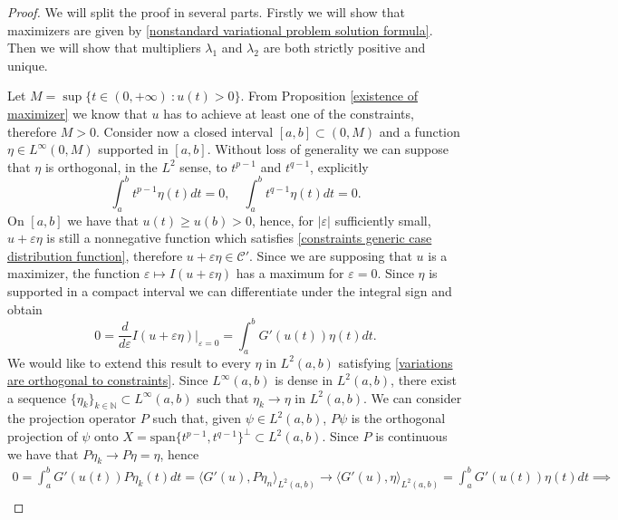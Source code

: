 \documentclass[corpo=11pt, stile=classica, tipotesi=custom,
greek, evenboxes, english]{toptesi}
\numberwithin{equation}{chapter}
\newcommand{\N}{\mathbb{N}} %
\begin{document}
\begin{proof}
{\color{blue} We will split the proof in several parts. Firstly we will show that maximizers are given by \eqref{nonstandard variational problem solution formula}. Then we will show that multipliers $\lambda_1$ and $\lambda_2$ are both strictly positive and unique.}

Let $M = \sup\{t \in (0,+\infty)\ : u(t) > 0\}$. From Proposition \ref{existence of maximizer} we know that $u$ has to achieve at least one of the constraints, therefore $M>0$. Consider now a closed interval $[a,b] \subset (0,M)$ and a function $\eta \in L^{\infty}(0,M)$ supported in $[a,b]$. Without loss of generality we can suppose that $\eta$ is orthogonal, in the $L^2$ sense, to $t^{p-1}$ and $t^{q-1}$, explicitly
\begin{equation}\label{variations are orthogonal to constraints}
	\int_a^b t^{p-1} \eta(t) dt=0, \quad \int_a^b t^{q-1} \eta(t) dt=0.
\end{equation}
On $[a,b]$ we have that $u(t) \geq u(b) > 0$, hence, for $|\varepsilon|$ sufficiently small, $u+\varepsilon\eta$ is still a nonnegative function which satisfies \eqref{constraints generic case distribution function}, therefore $u+\varepsilon\eta \in \mathcal{C}'$. Since we are supposing that $u$ is a maximizer, the function $\varepsilon \mapsto I(u+\varepsilon\eta)$ has a maximum for $\varepsilon = 0$. Since $\eta$ is supported in a compact interval we can differentiate under the integral sign and obtain
\begin{equation*}
	0 = \dfrac{d}{d\varepsilon}I(u+\varepsilon\eta) \lvert_{\varepsilon=0} = \int_a^b G'(u(t))\eta(t)dt.
\end{equation*}
We would like to extend this result to every $\eta$ in $L^2(a,b)$ satisfying \eqref{variations are orthogonal to constraints}. {\color{blue}Since $L^{\infty}(a,b)$ is dense in $L^2(a,b)$, there exist a sequence $\{\eta_k\}_{k \in \N} \subset L^{\infty}(a,b)$ such that $\eta_k \rightarrow \eta$ in $L^2(a,b)$. We can consider the projection operator $P$ such that, given $\psi \in L^2(a,b)$, $P\psi$ is the orthogonal projection of $\psi$ onto $ X = \mathrm{span}\{t^{p-1},t^{q-1}\}^{\perp} \subset L^2(a,b)$. Since $P$ is continuous we have that $P\eta_k \rightarrow P\eta = \eta$, hence
\begin{gather}
	0 = \int_a^b G'(u(t)) P\eta_k(t) dt = \langle G'(u), P\eta_n \rangle_{L^2(a,b)} \rightarrow \langle G'(u), \eta \rangle_{L^2(a,b)} = \int_a^b G'(u(t)) \eta(t) dt \implies \nonumber\\

\end{gather}}
\end{proof}
\end{document}
